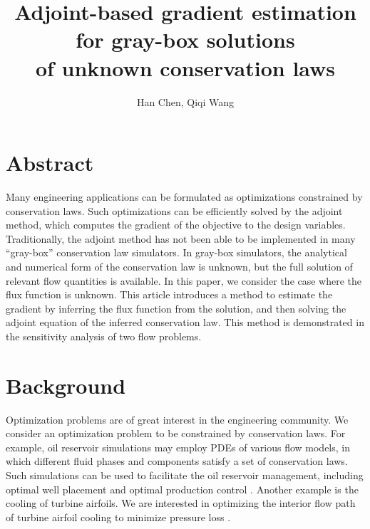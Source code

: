 \documentclass[a4paper,onecolumn]{article}
\theoremstyle{remark}
\begin{document}
\title{Adjoint-based gradient estimation for gray-box solutions \\
       of unknown conservation laws}
\author{Han Chen, Qiqi Wang}
\date{}
\maketitle
\section{Abstract}

\indent
Many engineering applications can be formulated as optimizations constrained by conservation laws.
Such optimizations can be efficiently solved by the adjoint method, which computes the gradient of
the objective to the design variables.
Traditionally, the adjoint method has not been able to be
implemented in many ``gray-box'' conservation law 
simulators. In gray-box simulators, the analytical and numerical
form of the conservation law is unknown, but the full solution of relevant flow quantities is
available.
In this paper, we consider the case where the flux function is unknown.
This article introduces a method to estimate the gradient by
inferring the flux function from the solution, and then solving the adjoint equation of
the inferred conservation law.
This method is demonstrated in the sensitivity analysis of two flow problems.


\section{Background}
\label{background}
\noindent Optimization problems are of great interest in the engineering community. We consider an 
optimization problem to be
constrained by conservation laws.
For example, oil reservoir simulations may employ PDEs of various flow models, 
in which different fluid phases and components satisfy a set of conservation laws.
Such simulations can be used to facilitate the oil reservoir management,
including optimal well placement \cite{adjoint well placement} 
and optimal production control \cite{water flooding control,first reservoir opt}.
Another example is the cooling of turbine airfoils. 
We are interested in optimizing the interior flow path
of turbine airfoil cooling to minimize pressure loss
\cite{ubend rans opt 1, ubend rans opt 2}.\\
\end{document}
